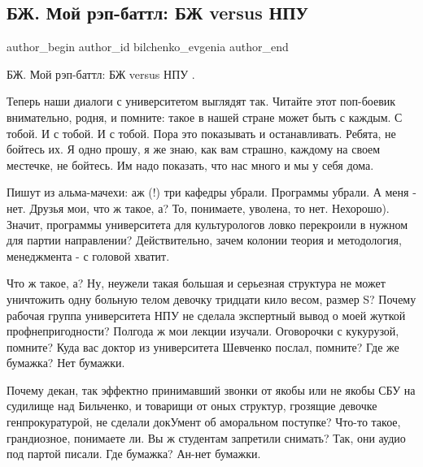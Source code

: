  
 
 
 
 
 
\subsection{БЖ. Мой рэп-баттл: БЖ versus НПУ}
\label{sec:27_07_2021.fb.bilchenko_evgenia.3.npu}
 
\ifcmt
 author_begin
   author_id bilchenko_evgenia
 author_end
\fi

БЖ. Мой рэп-баттл: БЖ versus НПУ .

Теперь наши диалоги с университетом выглядят так. Читайте этот поп-боевик
внимательно, родня, и помните: такое в нашей стране может быть с каждым. С
тобой. И с тобой. И с тобой. Пора это показывать и останавливать. Ребята, не
бойтесь их. Я одно прошу, я же знаю, как вам страшно, каждому на своем
местечке, не бойтесь. Им надо показать, что нас много и мы у себя дома.

Пишут из альма-мачехи: аж (!) три кафедры убрали. Программы убрали. А меня -
нет. Друзья мои, что ж такое, а? То, понимаете, уволена, то нет. Нехорошо).
Значит, программы университета для культурологов ловко перекроили в нужном для
партии направлении? Действительно, зачем колонии теория и методология,
менеджмента - с головой хватит.

Что ж такое, а? Ну, неужели такая большая и серьезная структура не может
уничтожить одну больную телом девочку тридцати кило весом, размер S? Почему
рабочая группа университета НПУ не сделала экспертный вывод о моей жуткой
профнепригодности? Полгода ж мои лекции изучали. Оговорочки с кукурузой,
помните? Куда вас доктор из университета Шевченко послал, помните? Где же
бумажка? Нет бумажки. 

Почему декан, так эффектно принимавший звонки от якобы или не якобы СБУ на
судилище над Бильченко, и товарищи от оных структур, грозящие девочке
генпрокуратурой, не сделали докУмент об аморальном поступке? Что-то такое,
грандиозное, понимаете ли. Вы ж студентам запретили снимать? Так, они аудио под
партой писали. Где бумажка? Ан-нет бумажки. 


